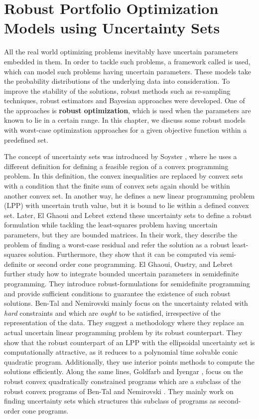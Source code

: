 \chapter{Robust Portfolio Optimization Models using Uncertainty Sets}

All the real world optimizing problems inevitably have uncertain parameters embedded in them. In order to tackle such problems, a framework called  \cite{stochastic_prog} is used, which can model such problems having uncertain parameters. These models take the probability distributions of the underlying data into consideration. To improve the stability of the solutions, robust methods such as re-sampling techniques, robust estimators and Bayesian approaches were developed. One of the approaches is \textbf{robust optimization}, which is used when the parameters are known to lie in a certain range. In this chapter, we discuss some robust models with worst-case optimization approaches for a given objective function within a predefined  set. 

The concept of uncertainty sets was introduced by Soyster \cite{soyster}, where he uses a different definition for defining a feasible region of a convex programming problem. In this definition, the convex inequalities are replaced by convex sets with a condition that the finite sum of convex sets again should be within another convex set. In another way, he defines a new linear programming problem (LPP) with uncertain truth value, but it is bound to lie within a defined convex set. Later, El Ghaoui and Lebret \cite{elg_lsq} extend these uncertainty sets to define a robust formulation while tackling the least-squares problem having uncertain parameters, but they are bounded matrices. In their work, they describe the problem of finding a worst-case residual and refer the solution as a robust least-squares solution. Furthermore, they show that it can be computed via semi-definite or second order cone programming. El Ghaoui, Oustry, and Lebret \cite{elg_semidefinite} further study how to integrate bounded uncertain parameters in semidefinite programming. They introduce robust-formulations for semidefinite programming and provide sufficient conditions to guarantee the existence of such robust solutions. Ben-Tal and Nemirovski \cite{bental_rc} mainly focus on the uncertainty related with \textit{hard} constraints and which are \textit{ought} to be satisfied, irrespective of the representation of the data. They suggest a methodology where they replace an actual uncertain linear programming problem by its robust counterpart. They show that the robust counterpart  of an LPP with the ellipsoidal uncertainty set is computationally attractive, as it reduces to a polynomial time solvable conic quadratic program. Additionally, they use interior points methods \cite{bental_interior} to compute the solutions efficiently. Along the same lines, Goldfarb and Iyengar \cite{Goldfarb}, focus on the robust convex quadratically constrained programs which are a subclass of the robust convex programs of Ben-Tal and Nemirovski \cite{bental_rc}. They mainly work on finding uncertainty sets which structures this subclass of programs as second-order cone programs. 

